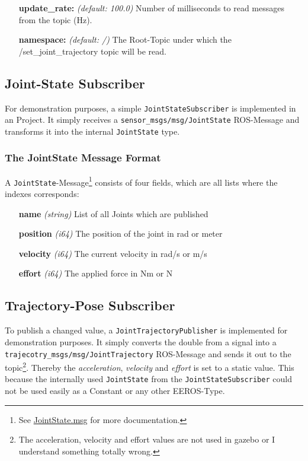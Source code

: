\begin{enumerate}
    \item[\textbf{update\_rate:}] \textit{(default: 100.0)} Number of milliseconds to read messages from the topic (Hz).
    \item[\textbf{namespace:}] \textit{(default: /)} The Root-Topic under which the /set\_joint\_trajectory topic will be read.
\end{enumerate}



\subsection[Subscriber]{Joint-State Subscriber} \label{sec:demo-subscriber}

For demonstration purposes, a simple \texttt{JointStateSubscriber} is implemented in an  Project.
It simply receives a \texttt{sensor\_msgs/msg/JointState} ROS-Message and transforms it into the internal \texttt{JointState} type.

\subsubsection[JointState-Message]{The JointState Message Format} \label{sec:deom-subscriber-message}

A \texttt{JointState}-Message\footnote{See \href{https://docs.ros2.org/latest/api/sensor_msgs/msg/JointState.html}{JointState.msg} for more documentation.} consists of four fields, which are all lists where the indexes corresponds:

\begin{enumerate}
    \item[\textbf{name}] \textit{(string)} List of all Joints which are published
    \item[\textbf{position}] \textit{(i64)} The position of the joint in rad or meter
    \item[\textbf{velocity}] \textit{(i64)} The current velocity in rad/s or m/s
    \item[\textbf{effort}] \textit{(i64)} The applied force in Nm or N
\end{enumerate}


\subsection[Publisher]{Trajectory-Pose Subscriber} \label{sec:demo-publisher}

To publish a changed value, a \texttt{JointTrajectoryPublisher} is implemented for demonstration purposes.
It simply converts the double from a signal into a\\
\texttt{trajecotry\_msgs/msg/JointTrajectory} ROS-Message and sends it out to the topic\footnote{The acceleration, velocity and effort values are not used in \Gls{gazebo} or I understand something totally wrong.}.
Thereby the \textit{acceleration}, \textit{velocity} and \textit{effort} is set to a static value.
This because the internally used \texttt{JointState} from the \texttt{JointStateSubscriber} could not be used easily as a Constant or any other EEROS-Type.

